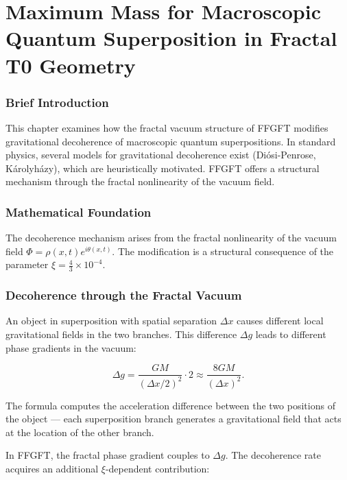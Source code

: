 \chapter{Maximum Mass for Macroscopic Quantum Superposition in Fractal T0 Geometry}


	
	\subsection*{Brief Introduction}
	
	This chapter examines how the fractal vacuum structure of FFGFT modifies gravitational decoherence of macroscopic quantum superpositions. In standard physics, several models for gravitational decoherence exist (Diósi-Penrose, Károlyházy), which are heuristically motivated. FFGFT offers a structural mechanism through the fractal nonlinearity of the vacuum field.
	
	\subsection*{Mathematical Foundation}
	
	The decoherence mechanism arises from the fractal nonlinearity of the vacuum field \(\Phi = \rho(x,t) e^{i\theta(x,t)}\). The modification is a structural consequence of the parameter \(\xi = \frac{4}{3} \times 10^{-4}\).
	

	
	\subsection*{Decoherence through the Fractal Vacuum}
	
	An object in superposition with spatial separation \(\Delta x\) causes different local gravitational fields in the two branches. This difference \(\Delta g\) leads to different phase gradients in the vacuum:
	
	\begin{equation}
		\Delta g = \frac{G M}{(\Delta x/2)^2} \cdot 2 \approx \frac{8 G M}{(\Delta x)^2}.
	\end{equation}
	
	The formula computes the acceleration difference between the two positions of the object — each superposition branch generates a gravitational field that acts at the location of the other branch.
	
	In FFGFT, the fractal phase gradient couples to \(\Delta g\). The decoherence rate acquires an additional \(\xi\)-dependent contribution:
	
